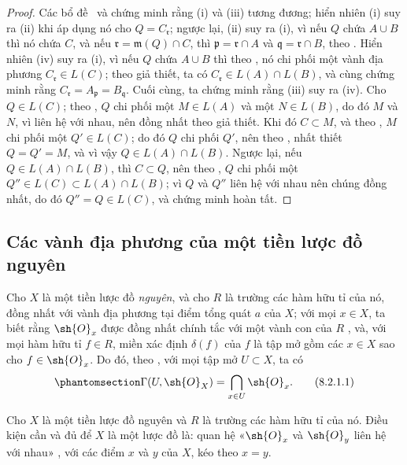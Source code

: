 \documentclass[oneside]{amsart}
\let\EGAOriginalLabel\label
\renewcommand{\label}[1]{\phantomsection\EGAOriginalLabel{#1}}
\begin{document}
\begin{proof}
Các bổ đề~ và  chứng minh rằng (i) và (iii) tương đương;
hiển nhiên (i) suy ra (ii) khi áp dụng nó cho $Q=C_{\mathfrak{r}}$;
ngược lại, (ii) suy ra (i), vì nếu $Q$ chứa $A\cup B$ thì nó chứa $C$, và nếu $\mathfrak{r}=\mathfrak{m}(Q)\cap C$, thì $\mathfrak{p}=\mathfrak{r}\cap A$ và $\mathfrak{q}=\mathfrak{r}\cap B$, theo .
Hiển nhiên (iv) suy ra (i), vì nếu $Q$ chứa $A\cup B$ thì theo , nó chi phối một vành địa phương $C_{\mathfrak{r}}\in L(C)$;
theo giả thiết, ta có $C_{\mathfrak{r}}\in L(A)\cap L(B)$, và  cùng  chứng minh rằng $C_{\mathfrak{r}}=A_{\mathfrak{p}}=B_{\mathfrak{q}}$.
Cuối cùng, ta chứng minh rằng (iii) suy ra (iv).
Cho $Q\in L(C)$;
theo , $Q$ chi phối một $M\in L(A)$ và một $N\in L(B)$, do đó $M$ và $N$, vì liên hệ với nhau, nên đồng nhất theo giả thiết.
Khi đó $C\subset M$, và theo , $M$ chi phối một $Q'\in L(C)$; do đó $Q$ chi phối $Q'$, nên theo , nhất thiết $Q=Q'=M$, và vì vậy $Q\in L(A)\cap L(B)$.
Ngược lại, nếu $Q\in L(A)\cap L(B)$, thì $C\subset Q$, nên theo , $Q$ chi phối một $Q''\in L(C)\subset L(A)\cap L(B)$;
vì $Q$ và $Q''$ liên hệ với nhau nên chúng đồng nhất, do đó $Q''=Q\in L(C)$, và chứng minh hoàn tất.
\end{proof}

\subsection{Các vành địa phương của một tiền lược đồ nguyên}
\label{subsection:I.8.2}

\begin{env}[8.2.1]
\label{I.8.2.1}
Cho $X$ là một tiền lược đồ \emph{nguyên}, và cho $R$ là trường các hàm hữu tỉ của nó, đồng nhất với vành địa phương tại điểm tổng quát $a$ của $X$;
với mọi $x\in X$, ta biết rằng $\sh{O}_x$ được đồng nhất chính tắc với một vành con của $R$ , và, với mọi hàm hữu tỉ $f\in R$, miền xác định $\delta(f)$ của $f$ là tập mở gồm các $x\in X$ sao cho
$f\in\sh{O}_x$.
Do đó, theo , với mọi tập mở $U\subset X$, ta có
\[
\label{I.8.2.1.1}
  \Gamma(U,\sh{O}_X)=\bigcap_{x\in U}\sh{O}_x.
  \tag{8.2.1.1}
\]
\end{env}

\begin{proposition}[8.2.2]
\label{I.8.2.2}
Cho $X$ là một tiền lược đồ nguyên và $R$ là trường các hàm hữu tỉ của nó. Điều kiện cần và đủ để $X$ là một lược đồ là: quan hệ «$\sh{O}_x$ và $\sh{O}_y$ liên hệ với nhau» , với các điểm $x$ và $y$ của $X$, kéo theo $x=y$.
\end{proposition}
\end{document}
